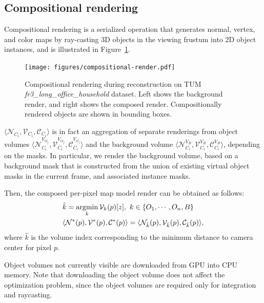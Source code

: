 \subsection{Compositional rendering} \label{subsec: rendering}
Compositional rendering is a serialized operation that generates normal, vertex, and color maps by ray-casting 3D objects in the viewing frustum into 2D object instances, and is illustrated in Figure~\ref{fig:compositional_render}.

\begin{figure}[t!]
    \centering
    \texttt{[image: figures/compositional-render.pdf]}\vspace{-5mm}
    \caption{Compositional rendering during reconstruction on TUM \textit{fr3\_long\_office\_household} dataset. Left shows the background render, and right shows the composed render. Compositionally rendered objects are shown in bounding boxes.}
    \vspace*{-1em}
    \label{fig:compositional_render}
\end{figure}

\(\langle \mathcal{N}_{C_i}, \mathcal{V}_{C_i}, \mathcal{C}_{C_i} \rangle \) is in fact an aggregation of separate renderings from object volumes \(\langle \mathcal{N}_{C_i}^{V_{{O}_j}}, \mathcal{V}_{C_i}^{V_{{O}_j}}, \mathcal{C}_{C_i}^{V_{\mathcal{O}_j}} \rangle \) and the background volume \(\langle \mathcal{N}_{C_i}^{V_{B}}, \mathcal{V}_{C_i}^{V_{B}}, \mathcal{C}_{C_i}^{V_{{B}}}  \rangle \), depending on the masks. In particular, we render the background volume, based on a background mask that is constructed from the union of existing virtual object masks in the current frame, and associated instance masks.

Then, the composed per-pixel map model render can be obtained as follows:
\begin{align}
    &\hat{k} = \operatorname*{\arg\!\min}_k \mathcal{V}_k(p)[z], ~k \in \{O_1, \cdots, O_n, B\} \\
    &\langle \mathcal{N}^*(p), \mathcal{V}^*(p), \mathcal{C}^*(p) \rangle = \langle  \mathcal{N}_{\hat{k}}(p), \mathcal{V}_{\hat{k}}(p), \mathcal{C}_{\hat{k}}(p) \rangle,
\end{align}
where $\hat{k}$ is the volume index corresponding to the minimum distance to camera center for pixel $p$.

Object volumes not currently visible are downloaded from GPU into CPU memory. Note that downloading the object volume does not affect the optimization problem, since the object volumes are required only for integration and raycasting.

